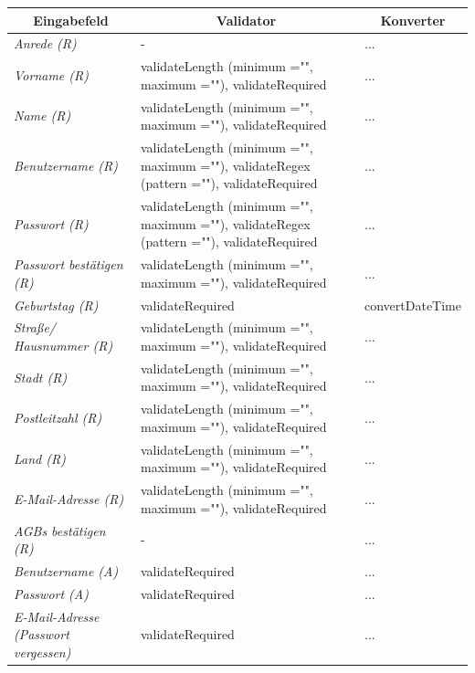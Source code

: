 \begin{itemize}
\begin{itemize}
\begin{center}
\begin{longtable}{|p{3cm} |p{8cm} | p{5cm}|}
						\hline \multicolumn{1}{|c|}{\textbf{Eingabefeld}} & \multicolumn{1}{|c|}{\textbf{Validator}} & \multicolumn{1}{|c|}{\textbf{Konverter}} \\ \hline
						\endfirsthead
						\hline
						\endlastfoot
						\textit{Anrede (R)} & - & ...  \\ \hline
						\textit{Vorname (R)} & validateLength (minimum ="", maximum =""), validateRequired & ... \\ \hline
						\textit{Name (R)} & validateLength (minimum ="", maximum =""), validateRequired & ...  \\ \hline
						\textit{Benutzername (R)} & validateLength (minimum ="", maximum =""), validateRegex (pattern =""), validateRequired  & ... \\ \hline
						\textit{Passwort (R)} & validateLength (minimum ="", maximum =""), validateRegex (pattern =""), validateRequired & ...  \\ \hline
						\textit{Passwort bestätigen (R)} & validateLength (minimum ="", maximum =""), validateRequired & ... \\ \hline
						\textit{Geburtstag (R)} & validateRequired & convertDateTime  \\ \hline
						\textit{Straße/ Hausnummer (R)} & validateLength (minimum ="", maximum =""), validateRequired & ... \\ \hline
						\textit{Stadt (R)} & validateLength (minimum ="", maximum =""), validateRequired & ...  \\ \hline
						\textit{Postleitzahl (R)} & validateLength (minimum ="", maximum =""), validateRequired & ... \\ \hline
						\textit{Land (R)} & validateLength (minimum ="", maximum =""), validateRequired & ...  \\ \hline
						\textit{E-Mail-Adresse (R)} & validateLength (minimum ="", maximum =""), validateRequired & ... \\ \hline
						\textit{AGBs bestätigen (R)} & - & ...  \\ \hline
						\textit{Benutzername (A)} & validateRequired & ...  \\ \hline
						\textit{Passwort (A)} & validateRequired & ...  \\ \hline
						\textit{E-Mail-Adresse (Passwort vergessen)} & validateRequired & ... \\ \hline
					\end{longtable}
				\end{center}
				

\end{itemize}
\end{itemize}
